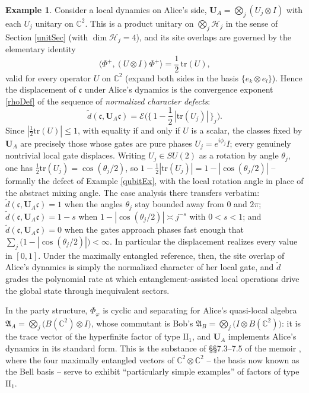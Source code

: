 \documentclass[twoside,11pt,letter]{article}
\def\bC{\mathbb{C}}
\def\cH{{\mathcal{H}}}
\def\fc{{\mathfrak{c}}}
\newcommand{\tr}{\mathrm{tr}}
\newcommand{\cexp}{\mathcal{E}}  %
\theoremstyle{definition}
\theoremstyle{definition}
\newtheorem{example}[theorem]{Example}
\theoremstyle{plain}
\newenvironment{remark}[1][Remark.]{\begin{trivlist}
\item[\hskip \labelsep {\bfseries #1}]}{\end{trivlist}}
\begin{document}
\begin{example}
Consider a local dynamics on Alice's side, $\mathbf{U}_A=\bigotimes_j(U_j\otimes I)$ with each $U_j$ unitary on $\bC^2$. This is a product unitary on $\bigotimes_j\cH_j$ in the sense of Section \ref{unitSec} (with $\dim\cH_j=4$), and its site overlaps are governed by the elementary identity
\begin{equation}\label{traceIdentity}
\langle\Phi^+,(U\otimes I)\Phi^+\rangle=\frac12\,\tr(U),
\end{equation}
valid for every operator $U$ on $\bC^2$ (expand both sides in the basis $\{e_k\otimes e_l\}$). Hence the displacement of $\fc$ under Alice's dynamics is the convergence exponent \eqref{rhoDef} of the sequence of \emph{normalized character defects}:
\begin{equation}
\label{bellDisplacement}
\tilde d(\fc,\mathbf{U}_A\fc)=\cexp\big(\big\{\,1-\frac12\,|\tr(U_j)|\,\big\}_j\big).
\end{equation}
Since $|\tfrac12\tr(U)|\leq1$, with equality if and only if $U$ is a scalar, the classes fixed by $\mathbf{U}_A$ are precisely those whose gates are pure phases $U_j=e^{i\phi_j}I$; every genuinely nontrivial local gate displaces. Writing $U_j\in SU(2)$ as a rotation by angle $\theta_j$, one has $\tfrac12\tr(U_j)=\cos(\theta_j/2)$, so $1-\tfrac12|\tr(U_j)|=1-|\cos(\theta_j/2)|$ -- formally the defect of Example \ref{qubitEx}, with the local rotation angle in place of the abstract mixing angle. The case analysis there transfers verbatim: $\tilde d(\fc,\mathbf{U}_A\fc)=1$ when the angles $\theta_j$ stay bounded away from $0$ and $2\pi$; $\tilde d(\fc,\mathbf{U}_A\fc)=1-s$ when $1-|\cos(\theta_j/2)|\asymp j^{-s}$ with $0<s<1$; and $\tilde d(\fc,\mathbf{U}_A\fc)=0$ when the gates approach phases fast enough that $\sum_j\big(1-|\cos(\theta_j/2)|\big)<\infty$. In particular the displacement realizes every value in $[0,1]$. Under the maximally entangled reference, then, the site overlap of Alice's dynamics is simply the normalized character of her local gate, and $\tilde d$ grades the polynomial rate at which entanglement-assisted local operations drive the global state through inequivalent sectors.
\end{example}

\begin{remark}
In the party structure, $\Phi_\varphi$ is cyclic and separating for Alice's quasi-local algebra $\mathfrak{A}_A=\bigotimes_j\big(B(\bC^2)\otimes I\big)$, whose commutant is Bob's $\mathfrak{A}_B=\bigotimes_j\big(I\otimes B(\bC^2)\big)$: it is the trace vector of the hyperfinite factor of type $\mathrm{II}_1$, and $\mathbf{U}_A$ implements Alice's dynamics in its standard form. This is the substance of \S\S 7.3--7.5 of the memoir \cite{vN39}, where the four maximally entangled vectors of $\bC^2\otimes\bC^2$ -- the basis now known as the Bell basis -- serve to exhibit ``particularly simple examples'' of factors of type $\mathrm{II}_1$.
\end{remark}
\end{document}

